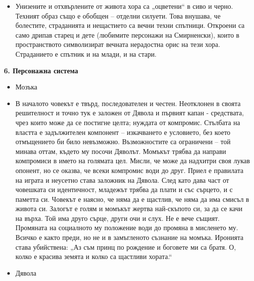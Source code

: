\documentclass[12pt,a4paper]{article}
\begin{document}
\begin{itemize}[leftmargin=*]
\vspace{-0.65cm}
\item Унизените и отхвърлените от живота хора са „оцветени“ в сиво и черно. Техният образ също е обобщен – отделни силуети. Това внушава, че болестите, страданията и нещастието са вечни техни спътници. Откроени са само дрипав старец и дете (любимите персонажи на Смирненски), които в пространството символизират вечната нерадостна орис на тези хора. Страданието е спътник и на млади, и на стари.  
\end{itemize}

\vspace{0.1cm}
 
\noindent 
\textbf{6. Персонажна система}
\begin{itemize}[leftmargin=*]
\vspace{-0.2cm}
\item Мозъка
\end{itemize}

\begin{itemize}
\vspace{-0.65cm}
\item В началото човекът е твърд, последователен и честен. Неотклонен в своята решителност и точно тук е заложен от Дявола и първият капан -  средствата, чрез които може да се постигне целта; нуждата от компромис.
Стълбата на властта е задължителен компонент – изкачването е условието, без което отмъщението би било невъзможно. Възможностите са ограничени – той минава оттам, където му посочи Дяволът.
Момъкът трябва да направи компромиси в името на голямата цел. Мисли, че може да надхитри своя лукав опонент, но се оказва, че всеки компромис води до друг. Приел е правилата на играта и неусетно става заложник на Дявола.
След като дава част от човешката си идентичност, младежът трябва да плати и със сърцето, и с паметта си. Човекът е наясно, че няма да е щастлив, че няма да има смисъл в живота си.
Залогът е голям и момъкът жертва най-скъпото си, за да се качи на върха. Той има друго сърце, други очи и слух. Не е вече същият. Промяната на социалното му положение води до промяна в мисленето му. Всичко е както преди, но не и в замъгленото съзнание на момъка. Иронията става убийствена: „Аз съм принц по рождение и боговете ми са братя. О, колко е красива земята и колко са щастливи хората.“
\end{itemize}

\begin{itemize}[leftmargin=*]
\vspace{-0.65cm}
\item Дявола
\end{itemize}
\end{document}
